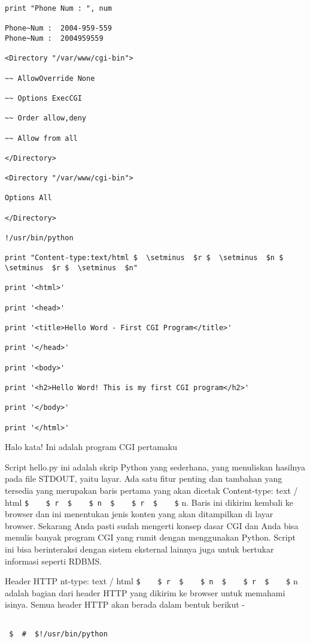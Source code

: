 \begin {enumerate}
\begin {enumerate}
\begin{verbatim}
print "Phone Num : ", num

Phone~Num :  2004-959-559
Phone~Num :  2004959559

<Directory "/var/www/cgi-bin">

~~ AllowOverride None

~~ Options ExecCGI

~~ Order allow,deny

~~ Allow from all

</Directory>

<Directory "/var/www/cgi-bin">

Options All

</Directory>

!/usr/bin/python

print "Content-type:text/html $  \setminus  $r $  \setminus  $n $  \setminus  $r $  \setminus  $n"

print '<html>'

print '<head>'

print '<title>Hello Word - First CGI Program</title>'

print '</head>'

print '<body>'

print '<h2>Hello Word! This is my first CGI program</h2>'

print '</body>'

print '</html>'
\end{verbatim}

Halo kata! Ini adalah program CGI pertamaku

Script hello.py ini adalah skrip Python yang sederhana, yang menuliskan hasilnya pada file STDOUT, yaitu layar. Ada satu fitur penting dan tambahan yang tersedia yang merupakan baris pertama yang akan dicetak Content-type: text / html  \verb|$    $ r  $    $ n  $    $ r  $    $| n. Baris ini dikirim kembali ke browser dan ini menentukan jenis konten yang akan ditampilkan di layar browser. Sekarang Anda pasti sudah mengerti konsep dasar CGI dan Anda bisa menulis banyak program CGI yang rumit dengan menggunakan Python. Script ini bisa berinteraksi dengan sistem eksternal lainnya juga untuk bertukar informasi seperti RDBMS.

Header HTTP
nt-type: text / html  \verb|$    $ r  $    $ n  $    $ r  $    $| n adalah bagian dari header HTTP yang dikirim ke browser untuk memahami isinya. Semua header HTTP akan berada dalam bentuk berikut -

\begin{verbatim}
  
 $  #  $!/usr/bin/python


\end{verbatim}
\end{enumerate}
\end{enumerate}

